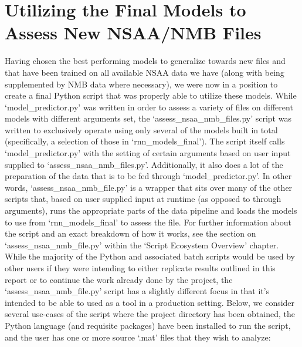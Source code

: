 \documentclass[12pt,twoside]{report}
\begin{document}
\section{Utilizing the Final Models to Assess New NSAA/NMB Files}

\quad Having chosen the best performing models to generalize towards new files and that have been trained on all available NSAA data we have (along with being supplemented by NMB data where necessary), we were now in a position to create a final Python script that was properly able to utilize these models. While ‘model\_predictor.py’ was written in order to assess a variety of files on different models with different arguments set, the ‘assess\_nsaa\_nmb\_files.py’ script was written to exclusively operate using only several of the models built in total (specifically, a selection of those in ‘rnn\_models\_final’). The script itself calls ‘model\_predictor.py’ with the setting of certain arguments based on user input supplied to ‘assess\_nsaa\_nmb\_files.py’. Additionally, it also does a lot of the preparation of the data that is to be fed through ‘model\_predictor.py’. In other words, ‘assess\_nsaa\_nmb\_file.py’ is a wrapper that sits over many of the other scripts that, based on user supplied input at runtime (as opposed to through arguments), runs the appropriate parts of the data pipeline and loads the models to use from ‘rnn\_models\_final’ to assess the file. For further information about the script and an exact breakdown of how it works, see the section on ‘assess\_nsaa\_nmb\_file.py’ within the ‘Script Ecosystem Overview’ chapter.\\

\quad While the majority of the Python and associated batch scripts would be used by other users if they were intending to either replicate results outlined in this report or to continue the work already done by the project, the ‘assess\_nsaa\_nmb\_file.py’ script has a slightly different focus in that it’s intended to be able to used as a tool in a production setting. Below, we consider several use-cases of the script where the project directory has been obtained, the Python language (and requisite packages) have been installed to run the script, and the user has one or more source ‘.mat’ files that they wish to analyze:
\end{document}
